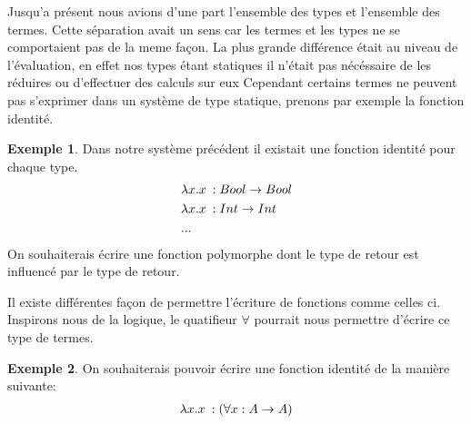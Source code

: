 \documentclass {article}
\theoremstyle{definition}
\newtheorem{example}{Exemple}
\theoremstyle{remark}
\begin{document}
Jusqu'a présent nous avions d'une part l'ensemble des types et l'ensemble des termes. Cette séparation 
avait un sens car les termes et les types ne se comportaient pas de la meme façon. La plus grande différence 
était au niveau de l'évaluation, en effet nos types étant statiques il n'était pas nécéssaire de les réduires
ou d'effectuer des calculs sur eux %
Cependant certains termes ne peuvent pas s'exprimer dans un système de type statique, prenons par exemple
la fonction identité. 
\begin{example}
  Dans notre système précédent il existait une fonction identité pour chaque type. 
  \begin{align*}
    &\lambda x. x\: :Bool\rightarrow Bool \\
    &\lambda x. x\: :Int\rightarrow Int \\
    & ... \\
  \end{align*}
On souhaiterais écrire une fonction polymorphe dont le type de retour est influencé par le type de retour.
\end{example}

Il existe différentes façon de permettre l'écriture de fonctions comme celles ci. Inspirons nous de la
logique, le quatifieur $\forall$ pourrait nous permettre d'écrire ce type de termes.
\begin{example}
  On souhaiterais pouvoir écrire une fonction identité de la manière suivante:
  \begin{align*}
    \lambda x. x\::(\forall x:A \rightarrow A)
  \end{align*}
\end{example}
\end{document}

